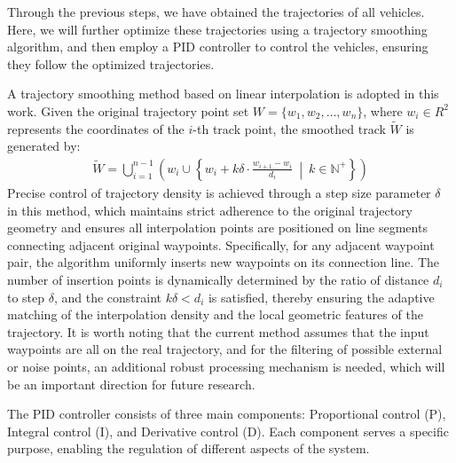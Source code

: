 \documentclass[lettersize,journal]{IEEEtran}
\begin{document}
Through the previous steps, we have obtained the trajectories of all vehicles. 
Here, we will further optimize these trajectories using a trajectory smoothing algorithm, and then employ a PID controller to control the vehicles, ensuring they follow the optimized trajectories\cite{Alpher22d}. 

A trajectory smoothing method based on linear interpolation is adopted in this work.
Given the original trajectory point set \(W = \{w_1,w_2 ,…,w_n\}\), where \(w_i \in R^2\) represents the coordinates of the \(i\)-th track point, the smoothed track \(\widetilde{W}\) is generated by:
\begin{align}
	\widetilde{W} = \bigcup_{i = 1}^{n-1} \left( w_i \cup \left\{ w_i + k\delta \cdot \frac{w_{i+1} - w_i}{d_i} \ \middle|\ k \in \mathbb{N}^+\right\} \right)
\end{align}
Precise control of trajectory density is achieved through a step size parameter \(\delta\) in this method, which maintains strict adherence to the original trajectory geometry and ensures all interpolation points are positioned on line segments connecting adjacent original waypoints.
Specifically, for any adjacent waypoint pair, the algorithm uniformly inserts new waypoints on its connection line. The number of insertion points is dynamically determined by the ratio of distance \(d_i\) to step \(\delta\), and the constraint \(k\delta < d_i\) is satisfied, thereby ensuring the adaptive matching of the interpolation density and the local geometric features of the trajectory.
It is worth noting that the current method assumes that the input waypoints are all on the real trajectory, and for the filtering of possible external or noise points, an additional robust processing mechanism is needed, which will be an important direction for future research.

The PID controller consists of three main components: Proportional control (P), Integral control (I), and Derivative control (D). Each component serves a specific purpose, enabling the regulation of different aspects of the system.
\end{document}
